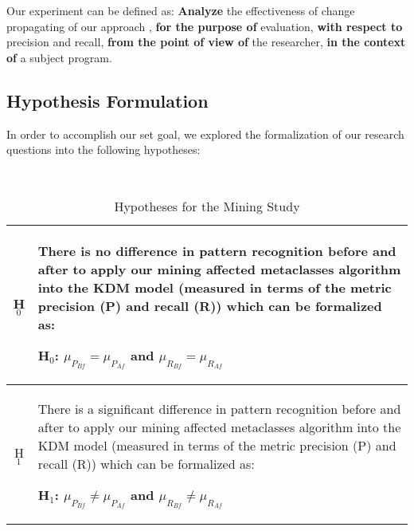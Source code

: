 Our experiment can be defined as: \textbf{Analyze} the effectiveness of change propagating of our approach , \textbf{for the purpose of} evaluation, \textbf{with respect to} precision and recall, \textbf{from the point of view of} the researcher, \textbf{in the context of} a subject program. 

\subsection{Hypothesis Formulation}\label{hypothesis_formulation}	
In order to accomplish our set goal, we explored the formalization of our research questions into the following hypotheses:



\begin{table}[h]
\centering
\caption{Hypotheses for the Mining Study\label{tab:hypotheses}}
~~\\
\begin{tabularx}{
.46\textwidth}{|c|X|}
\hline \cellcolor[gray]{\shadow} H$_0$ & \footnotesize{ There is no difference in pattern recognition before and after to apply our mining affected metaclasses algorithm into the KDM model (measured in terms of the metric precision (P) and recall (R)) which can be formalized as: 

\textbf{H$_{0}$: $\mu_{P_{Bf}} = \mu_{P_{Af}}$ and $\mu_{R_{Bf}} = \mu_{R_{Af}}$}}
\\
\hline \cellcolor[gray]{\shadow} H$_1$ & \footnotesize{There is a significant difference in pattern recognition before and after to apply our mining affected metaclasses algorithm into the KDM model (measured in terms of the metric precision (P) and recall (R)) which can be formalized as: 

\textbf{H$_{1}$: $\mu_{P_{Bf}} \neq \mu_{P_{Af}}$ and $\mu_{R_{Bf}} \neq \mu_{R_{Af}}$}}
\\
\hline
\end{tabularx}
\end{table}

